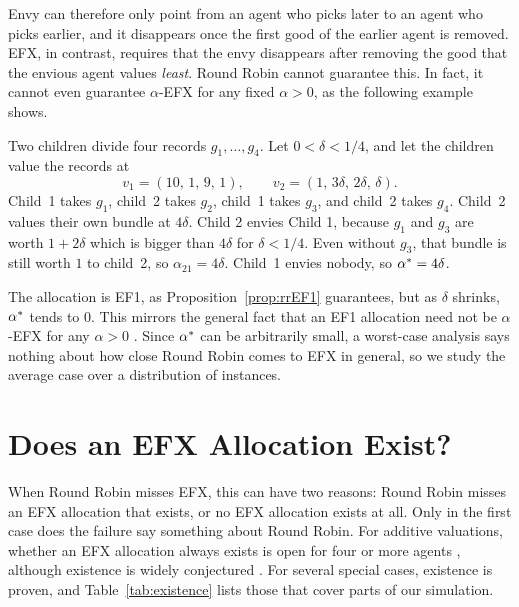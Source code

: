 Envy can therefore only point from an agent who picks later to an agent who picks earlier, and it
disappears once the first good of the earlier agent is removed. EFX, in contrast, requires that the
envy disappears after removing the good that the envious agent values \emph{least}. Round Robin
cannot guarantee this. In fact, it cannot even guarantee $\alpha$-EFX for any fixed $\alpha>0$, as
the following example shows.

\begin{example}\label{ex:witness}
Two children divide four records $g_1,\dots,g_4$. Let $0<\delta<1/4$, and let the children value the
records at
\[
  v_1=(10,\,1,\,9,\,1),\qquad v_2=(1,\,3\delta,\,2\delta,\,\delta).
\]
Child~1 takes $g_1$, child~2 takes $g_2$, child~1 takes
$g_3$, and child~2 takes $g_4$. Child~2 values their own bundle at $4\delta$. Child 2 envies Child 1, because $g_1$ and $g_3$ are worth $1+2\delta$ which is bigger than $4\delta$ for $\delta<1/4$. Even without $g_3$, that bundle is still worth $1$ to
child~2, so $\alpha_{21}=4\delta$. Child~1 envies nobody, so $\alpha^{*}=4\delta$.
\end{example}

The allocation is EF1, as Proposition~\ref{prop:rrEF1} guarantees, but as $\delta$ shrinks,
$\alpha^{*}$ tends to $0$. This mirrors the general fact that an EF1 allocation need not be
$\alpha$-EFX for any $\alpha>0$ \parencite[Prop.~3.1]{amanatidis2018comparing}. Since $\alpha^{*}$ can be
arbitrarily small, a worst-case analysis says nothing about how close Round Robin comes to EFX in general, so
we study the average case over a distribution of instances.

\section{Does an EFX Allocation Exist?}\label{sec:existence}

When Round Robin misses EFX, this can have two reasons: Round Robin misses an EFX allocation that
exists, or no EFX allocation exists at all. Only in the first case does the failure say something
about Round Robin. For additive valuations, whether an EFX allocation always exists is open for
four or more agents \parencite[Open Problem~2]{amanatidis2023survey}, although existence is widely
conjectured \parencite[p.~2]{branzei2025}. For several special cases, existence is proven, and
Table~\ref{tab:existence} lists those that cover parts of our simulation.

